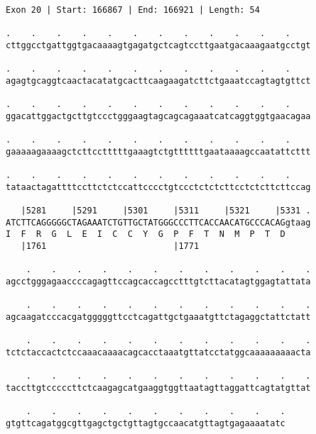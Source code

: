 \documentclass{article}
\begin{document}
\begin{Verbatim}[fontfamily=courier]
Exon 20 | Start: 166867 | End: 166921 | Length: 54

.    .    .    .    .    .    .    .    .    .    .    .    
cttggcctgattggtgacaaaagtgagatgctcagtccttgaatgacaaagaatgcctgt

.    .    .    .    .    .    .    .    .    .    .    .    
agagtgcaggtcaactacatatgcacttcaagaagatcttctgaaatccagtagtgttct

.    .    .    .    .    .    .    .    .    .    .    .    
ggacattggactgcttgtccctgggaagtagcagcagaaatcatcaggtggtgaacagaa

.    .    .    .    .    .    .    .    .    .    .    .    
gaaaaagaaaagctcttcctttttgaaagtctgttttttgaataaaagccaatattcttt

.    .    .    .    .    .    .    .    .    .    .    .    
tataactagattttccttctctccattcccctgtccctctctcttcctctcttcttccag

   |5281     |5291     |5301     |5311     |5321     |5331 .
ATCTTCAGGGGGCTAGAAATCTGTTGCTATGGGCCCTTCACCAACATGCCCACAGgtaag
I  F  R  G  L  E  I  C  C  Y  G  P  F  T  N  M  P  T  D     
   |1761                         |1771                      

    .    .    .    .    .    .    .    .    .    .    .    .
agcctgggagaaccccagagttccagcaccagcctttgtcttacatagtggagtattata

    .    .    .    .    .    .    .    .    .    .    .    .
agcaagatcccacgatgggggttcctcagattgctgaaatgttctagaggctattctatt

    .    .    .    .    .    .    .    .    .    .    .    .
tctctaccactctccaaacaaaacagcacctaaatgttatcctatggcaaaaaaaaacta

    .    .    .    .    .    .    .    .    .    .    .    .
taccttgtcccccttctcaagagcatgaaggtggttaatagttaggattcagtatgttat

    .    .    .    .    .    .    .    .    .    .    .
gtgttcagatggcgttgagctgctgttagtgccaacatgttagtgagaaaatatc
\end{Verbatim}
\newpage
\end{document}
